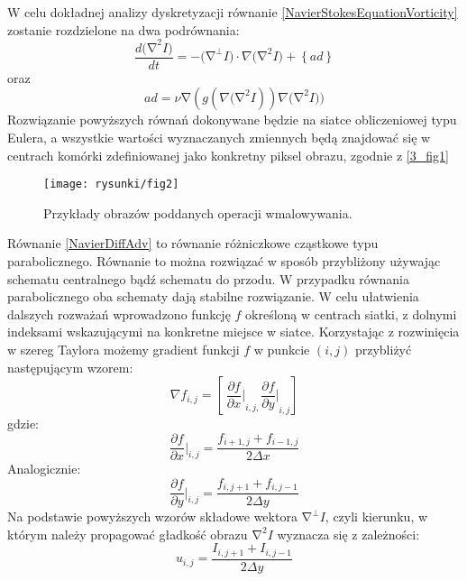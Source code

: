 \documentclass[12pt, twoside, openany]{report}
\theoremstyle{definition}
\begin{document}
W celu dokładnej analizy dyskretyzacji równanie \eqref{NavierStokesEquationVorticity} zostanie rozdzielone na dwa podrównania:
\begin{equation}
\frac{d{\mathrm{(}\mathrm{\nabla }}^2I)}{dt}=-{\mathrm{(}\mathrm{\nabla }}^{\bot }I)\cdot \nabla {\mathrm{(}\mathrm{\nabla }}^2I)+\left\{ad\right\}
\label{NavierDiffAdv}
\end{equation}
oraz
\begin{equation}
ad=\nu \mathrm{\nabla }(g(\nabla {\mathrm{(}\mathrm{\nabla }}^2I))\nabla {\mathrm{(}\mathrm{\nabla }}^2I))
\label{NavierAdv}
\end{equation}
Rozwiązanie powyższych równań dokonywane będzie na siatce obliczeniowej typu Eulera, a wszystkie wartości wyznaczanych zmiennych będą znajdować się w centrach komórki zdefiniowanej jako konkretny piksel obrazu, zgodnie z \autoref{3_fig1} 
\begin{figure}[!h]
	\centering
	\texttt{[image: rysunki/fig2]}
	\caption{Przykłady obrazów poddanych operacji wmalowywania.}
	\label{3_fig2}
\end{figure}
Równanie \eqref{NavierDiffAdv} to równanie różniczkowe cząstkowe typu parabolicznego. Równanie to  można rozwiązać w sposób przybliżony używając schematu centralnego bądź schematu do przodu. W przypadku równania parabolicznego oba schematy dają stabilne rozwiązanie. W celu ułatwienia dalszych rozważań wprowadzono funkcję $f$ określoną w centrach siatki, z dolnymi indeksami wskazującymi na konkretne miejsce w siatce. Korzystając z rozwinięcia w szereg Taylora możemy gradient funkcji $f$ w punkcie $(i,j)$ przybliżyć następującym wzorem:
\begin{equation}
\nabla f_{i,j}=\left[\ {\frac{\partial f}{\partial x}|}_{i,j,}{\frac{\partial f}{\partial y}|}_{i,j}\right]
\label{gradF}
\end{equation}
gdzie:
\begin{equation}
{\frac{\partial f}{\partial x}} {\bigg |}_{i,j}=\frac{f_{i+1,j}+f_{i-1,j}}{2\Delta x}
\label{dfdx}
\end{equation}
Analogicznie:
\begin{equation}
{\frac{\partial f}{\partial y}} {\bigg |}_{i,j}=\frac{f_{i,j+1}+f_{i,j-1}}{2\Delta y}
\label{dfdy}
\end{equation}
Na podstawie powyższych wzorów składowe wektora ${\mathrm{\nabla }}^{\bot }I$, czyli kierunku, w którym należy propagować gładkość obrazu ${\mathrm{\nabla }}^2I$ wyznacza się z zależności:
\begin{equation}
u_{i,j}=\frac{I_{i,j+1}+I_{i,j-1}}{2\Delta y} 
\label{u}
\end{equation}
\end{document}

